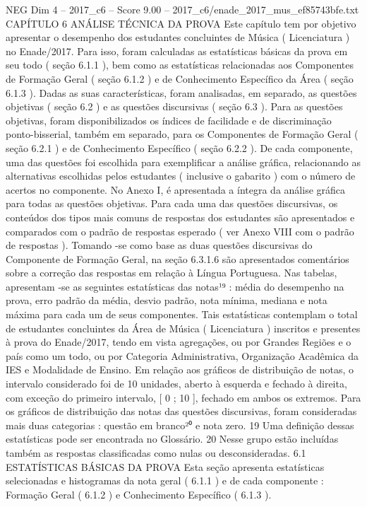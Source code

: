 \begin{textsample}{NEG Dim 4 – 2017\_c6 – Score 9.00 – 2017\_c6/enade\_2017\_mus\_ef85743bfe.txt}  \label{ex:f4_neg_322}
CAPÍTULO 6 ANÁLISE TÉCNICA DA PROVA Este capítulo tem por objetivo apresentar o desempenho dos estudantes concluintes de Música ( Licenciatura ) no Enade/2017.
Para isso, foram calculadas as estatísticas básicas da prova em seu todo ( seção 6.1.1 ), bem como as estatísticas relacionadas aos Componentes de Formação Geral ( seção 6.1.2 ) e de Conhecimento Específico da Área ( seção 6.1.3 ).
Dadas as suas características, foram analisadas, em separado, as questões objetivas ( seção 6.2 ) e as questões discursivas ( seção 6.3 ).
Para as questões objetivas, foram disponibilizados os índices de facilidade e de discriminação ponto-bisserial, também em separado, para os Componentes de Formação Geral ( seção 6.2.1 ) e de Conhecimento Específico ( seção 6.2.2 ).
De cada componente, uma das questões foi escolhida para exemplificar a análise gráfica, relacionando as alternativas escolhidas pelos estudantes ( inclusive o gabarito ) com o número de acertos no componente.
No Anexo I, é apresentada a íntegra da análise gráfica para todas as questões objetivas.
Para cada uma das questões discursivas, os conteúdos dos tipos mais comuns de respostas dos estudantes são apresentados e comparados com o padrão de respostas esperado ( ver Anexo VIII com o padrão de respostas ).
Tomando -se como base as duas questões discursivas do Componente de Formação Geral, na seção 6.3.1.6 são apresentados comentários sobre a correção das respostas em relação à Língua Portuguesa.
Nas tabelas, apresentam -se as seguintes estatísticas das notas¹⁹ : média do desempenho na prova, erro padrão da média, desvio padrão, nota mínima, mediana e nota máxima para cada um de seus componentes.
Tais estatísticas contemplam o total de estudantes concluintes da Área de Música ( Licenciatura ) inscritos e presentes à prova do Enade/2017, tendo em vista agregações, ou por Grandes Regiões e o país como um todo, ou por Categoria Administrativa, Organização Acadêmica da IES e Modalidade de Ensino.
Em relação aos gráficos de distribuição de notas, o intervalo considerado foi de 10 unidades, aberto à esquerda e fechado à direita, com exceção do primeiro intervalo, [ 0 ; 10 ], fechado em ambos os extremos.
Para os gráficos de distribuição das notas das questões discursivas, foram consideradas mais duas categorias : questão em branco²⁰ e nota zero. 19 Uma definição dessas estatísticas pode ser encontrada no Glossário. 20 Nesse grupo estão incluídas também as respostas classificadas como nulas ou desconsideradas. 6.1 ESTATÍSTICAS BÁSICAS DA PROVA Esta seção apresenta estatísticas selecionadas e histogramas da nota geral ( 6.1.1 ) e de cada componente : Formação Geral ( 6.1.2 ) e Conhecimento Específico ( 6.1.3 ).

\end{textsample}
